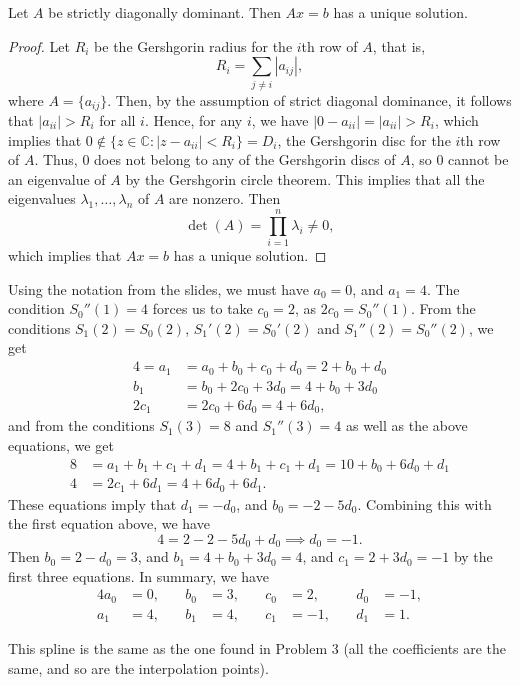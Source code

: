\documentclass{homework}
\begin{document}
	\question Let $A$ be strictly diagonally dominant. Then $Ax = b$ has a unique solution.
	\begin{proof}
		Let $R_i$ be the Gershgorin radius for the $i$th row of $A$, that is,
		\begin{equation*}
			R_i = \sum_{j\ne i} |a_{ij}|,
		\end{equation*}
		where $A=\{a_{ij}\}$. Then, by the assumption of strict diagonal dominance, it follows that $|a_{ii}| > R_i$ for all $i$. Hence, for any $i$, we have $|0 - a_{ii}| = |a_{ii}| > R_i$, which implies that $0 \notin \{z \in \mathbb{C} : |z - a_{ii}| < R_i\} = D_i$, the Gershgorin disc for the $i$th row of $A$. Thus, $0$ does not belong to any of the Gershgorin discs of $A$, so $0$ cannot be an eigenvalue of $A$ by the Gershgorin circle theorem. This implies that all the eigenvalues $\lambda_1, \dots, \lambda_n$ of $A$ are nonzero. Then
		\begin{equation*}
			\det(A) = \prod_{i=1}^n \lambda_i \ne 0,
		\end{equation*}
		which implies that $Ax = b$ has a unique solution.
	\end{proof}
	
	\question 
	\begin{alphaparts}
		\questionpart Using the notation from the slides, we must have $a_0 = 0$, and $a_1 = 4$. The condition $S_0''(1) = 4$ forces us to take $c_0 = 2$, as $2c_0 = S_0''(1)$. From the conditions $S_1(2) = S_0(2)$, $S_1'(2) = S_0'(2)$ and $S_1''(2) = S_0''(2)$, we get
		\begin{align*}
			4 = a_1 &= a_0 + b_0 + c_0 + d_0 = 2 +b_0  +d_0\\
			b_1 &= b_0 + 2c_0 + 3d_0 = 4 + b_0 + 3d_0\\
			2c_1 &= 2c_0 + 6d_0 = 4 + 6d_0,
		\end{align*}
		and from the conditions $S_1(3) = 8$ and $S_1''(3) = 4$ as well as the above equations, we get
		\begin{align*}
			8 &= a_1 + b_1 + c_1 + d_1 = 4 + b_1 + c_1 + d_1 = 10 + b_0 + 6d_0 + d_1\\
			4 &= 2c_1 + 6d_1 = 4 + 6d_0 + 6d_1.
		\end{align*}
		These equations imply that $d_1 = -d_0$, and $b_0 = -2-5d_0$. Combining this with the first equation above, we have
		\begin{equation*}
			4 = 2 - 2 - 5d_0 + d_0 \implies d_0 = -1.
		\end{equation*}
		Then $b_0 = 2 - d_0 = 3$, and $b_1 = 4 + b_0 + 3d_0 = 4$, and $c_1 = 2 + 3d_0 = -1$ by the first three equations. In summary, we have
		\begin{alignat*}{4}
			a_0 &= 0,& \quad b_0 &= 3,& \quad c_0 &= 2,& \quad d_0 &= -1,\\
			a_1 &= 4,& \quad b_1 &= 4,& \quad c_1 &= -1,&\quad d_1 &= 1.
		\end{alignat*}
		
		\questionpart This spline is the same as the one found in Problem 3 (all the coefficients are the same, and so are the interpolation points).
	\end{alphaparts}
	
\end{document}
